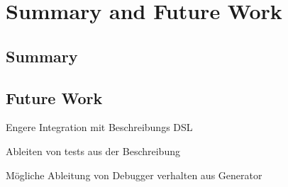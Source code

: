 \section{Summary and Future Work}


\subsection{Summary}

\subsection{Future Work}

Engere Integration mit Beschreibungs DSL

Ableiten von tests aus der Beschreibung

Mögliche Ableitung von Debugger verhalten aus Generator